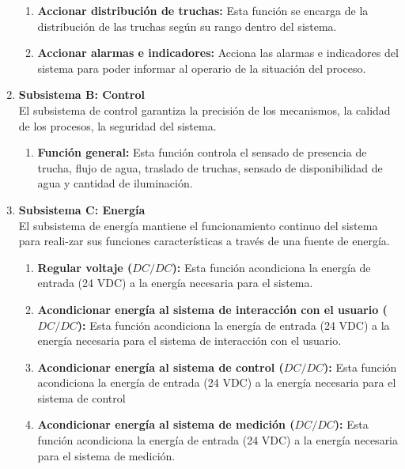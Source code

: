 \begin{enumerate}
\begin{enumerate}[label=\Alph*)]
		\item	\textbf{Accionar distribución de truchas:} Esta función se encarga de la distribución de las truchas según su rango dentro del sistema.
		
		\item	\textbf{Accionar alarmas e indicadores:} Acciona las alarmas e indicadores del sistema para poder informar al operario de la situación del proceso.
		
	\end{enumerate}
	
	\item \textbf{Subsistema B: Control}\\ El subsistema de control garantiza la precisión de los mecanismos, la calidad de los procesos, la seguridad del sistema.
	\begin{enumerate}[label=\Alph*)] %
		\item \textbf{Función general:} Esta función controla el sensado de presencia de trucha, flujo de agua, traslado de truchas, sensado de disponibilidad de agua y cantidad de iluminación.			
	\end{enumerate}
	
	\item \textbf{Subsistema C: Energía}\\ El subsistema de energía mantiene el funcionamiento continuo del sistema para reali-zar sus funciones características a través de una fuente de energía. 
	
	\begin{enumerate}[label=\Alph*)] %
		\item	\textbf{Regular voltaje ($ DC/DC $):} Esta función acondiciona la energía de entrada (24 VDC) a la energía necesaria para el sistema.
		
		\item	\textbf{Acondicionar energía al sistema de interacción con el usuario ($ DC/DC $):}		Esta función acondiciona la energía de entrada (24 VDC) a la energía necesaria para el sistema de interacción con el usuario.
		
		\item	\textbf{Acondicionar energía al sistema de control ($ DC/DC $):} Esta función acondiciona la energía de entrada (24 VDC) a la energía necesaria para el sistema de control
		
		\item	\textbf{Acondicionar energía al sistema de medición ($ DC/DC $):} Esta función acondiciona la energía de entrada (24 VDC) a la energía necesaria para el sistema de medición.
		

\end{enumerate}
\end{enumerate}
